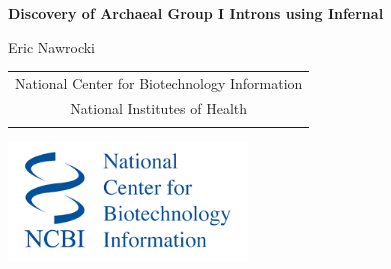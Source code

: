 \documentclass[landscape]{slides}
\begin{document}
\begin{slide}
\begin{center}
\large{\textbf{Discovery of Archaeal Group I Introns using Infernal}}

\normalsize

Eric Nawrocki

\medskip

\medskip

\small

\begin{tabular}{c}
National Center for Biotechnology Information\\
National Institutes of Health\\
\\
\end{tabular}

\vspace{0.1in}

\includegraphics[width=2.5in]{figs/ncbi-logo}

\end{center}
\end{slide}
\end{document}
